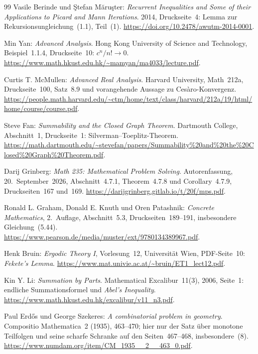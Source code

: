 \begin{thebibliography}{99}
Vasile Berinde und \c{S}tefan M\u{a}ru\c{s}ter:
\emph{Recurrent Inequalities and Some of their Applications to
Picard and Mann Iterations}. 2014, Druckseite~4:
Lemma zur Rekursionsungleichung~(1.1), Teil~(1).
\url{https://doi.org/10.2478/awutm-2014-0001}.

Min Yan: \emph{Advanced Analysis}.
Hong Kong University of Science and Technology,
Beispiel~1.1.4, Druckseite~10: $c^n/n!\to0$.
\url{https://www.math.hkust.edu.hk/~mamyan/ma4033/lecture.pdf}.

\newpage
{}
Curtis T. McMullen: \emph{Advanced Real Analysis}.
Harvard University, Math~212a, Druckseite~100, Satz~8.9
und vorangehende Aussage zu Cesàro-Konvergenz.
\url{https://people.math.harvard.edu/~ctm/home/text/class/harvard/212a/19/html/home/course/course.pdf}.

Steve Fan: \emph{Summability and the Closed Graph Theorem}.
Dartmouth College, Abschnitt~1, Druckseite~1:
Silverman--Toeplitz-Theorem.
\url{https://math.dartmouth.edu/~stevefan/papers/Summability%20and%20the%20Closed%20Graph%20Theorem.pdf}.


Darij Grinberg: \emph{Math 235: Mathematical Problem Solving}.
Autorenfassung, 20.~September~2026, Abschnitt~4.7.1,
Theorem~4.7.8 und Corollary~4.7.9, Druckseiten~167 und~169.
\url{https://darijgrinberg.gitlab.io/t/20f/mps.pdf}.

Ronald L. Graham, Donald E. Knuth und Oren Patashnik:
\emph{Concrete Mathematics}, 2.~Auflage, Abschnitt~5.3,
Druckseiten~189--191, insbesondere Gleichung~(5.44).
\url{https://www.pearson.de/media/muster/ext/9780134389967.pdf}.

Henk Bruin: \emph{Ergodic Theory I}, Vorlesung~12,
Universität Wien, PDF-Seite~10: \emph{Fekete's Lemma}.
\url{https://www.mat.univie.ac.at/~bruin/ET1_lect12.pdf}.


Kin Y. Li: \emph{Summation by Parts}.
Mathematical Excalibur~11(3), 2006, Seite~1:
endliche Summationsformel und \emph{Abel's Inequality}.
\url{https://www.math.hkust.edu.hk/excalibur/v11_n3.pdf}.

Paul Erdős und George Szekeres:
\emph{A combinatorial problem in geometry}.
Compositio Mathematica~2 (1935), 463--470;
hier nur der Satz über monotone Teilfolgen und seine scharfe
Schranke auf den Seiten~467--468, insbesondere~(8).
\url{https://www.numdam.org/item/CM_1935__2__463_0.pdf}.

\end{thebibliography}
